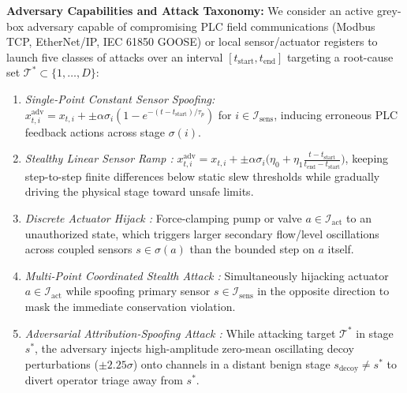 \documentclass[10pt,a4paper]{article}
\begin{document}
\textbf{Adversary Capabilities and Attack Taxonomy:} We consider an active grey-box adversary capable of compromising PLC field communications (Modbus TCP, EtherNet/IP, IEC 61850 GOOSE) or local sensor/actuator registers to launch five classes of attacks over an interval $[t_{\text{start}}, t_{\text{end}}]$ targeting a root-cause set $\mathcal{T}^* \subset \{1, \dots, D\}$:
\begin{enumerate}\setlength{\itemsep}{1pt}\setlength{\parskip}{0pt}
    \item \emph{Single-Point Constant Sensor Spoofing:} $x_{t,i}^{\text{adv}} = x_{t,i} + \pm \alpha \sigma_i (1 - e^{-(t - t_{\text{start}})/\tau_p})$ for $i \in \mathcal{I}_{\text{sens}}$, inducing erroneous PLC feedback actions across stage $\sigma(i)$.
    \item \emph{Stealthy Linear Sensor Ramp \cite{fung2024ndss}:} $x_{t,i}^{\text{adv}} = x_{t,i} + \pm \alpha \sigma_i \big(\eta_0 + \eta_1 \frac{t - t_{\text{start}}}{t_{\text{end}} - t_{\text{start}}}\big)$, keeping step-to-step finite differences below static slew thresholds while gradually driving the physical stage toward unsafe limits.
    \item \emph{Discrete Actuator Hijack \cite{fung2024ndss, franco2026shats}:} Force-clamping pump or valve $a \in \mathcal{I}_{\text{act}}$ to an unauthorized state, which triggers larger secondary flow/level oscillations across coupled sensors $s \in \sigma(a)$ than the bounded step on $a$ itself.
    \item \emph{Multi-Point Coordinated Stealth Attack \cite{rasheed2026xaicps}:} Simultaneously hijacking actuator $a \in \mathcal{I}_{\text{act}}$ while spoofing primary sensor $s \in \mathcal{I}_{\text{sens}}$ in the opposite direction to mask the immediate conservation violation.
    \item \emph{Adversarial Attribution-Spoofing Attack \cite{skrodelis2026review}:} While attacking target $\mathcal{T}^*$ in stage $s^*$, the adversary injects high-amplitude zero-mean oscillating decoy perturbations ($\pm 2.25\sigma$) onto channels in a distant benign stage $s_{\text{decoy}} \neq s^*$ to divert operator triage away from $s^*$.
\end{enumerate}
\end{document}
